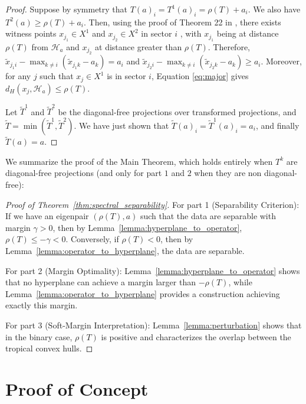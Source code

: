 \documentclass{article}
\renewcommand{\leq}{\leqslant}
\begin{document}
\begin{proof}
Suppose by symmetry that $T(a)_{i}=T^{1}(a)_{i}=\rho(T)+a_{i}$. We
also have $T^{2}(a)\ge\rho(T)+a_{i}$. Then, using the proof of Theorem
22 in \cite{akiangaubertqisaadi}, there exists witness points $x_{j_{1}}\in X^{1}$ and
$x_{j_{2}}\in X^{2}$ in sector $i$ , with $x_{j_{1}}$ being at
distance $\rho(T)$ from $\mathcal{H}_{a}$ and $x_{j_{2}}$ at distance
greater than $\rho(T)$. Therefore, $\tilde{x}_{j_{1}i}-\max_{k\ne i}(\tilde{x}_{j_{1}k}-a_{k})=a_{i}$
and $\tilde{x}_{j_{2}i}-\max_{k\ne i}(\tilde{x}_{j_{2}k}-a_{k})\ge a_{i}$.
Moreover, for any $j$ such that $x_{j}\in X^1$ is in sector $i$,
Equation \ref{eq:major} gives $d_{H}(x_{j},\mathcal{H}_{a})\le\rho(T)$.

Let $\tilde{T}^{1}$ and $\tilde{T}^{2}$ be the diagonal-free projections
over transformed projections, and $\tilde{T}=\min(\tilde{T}^{1},\tilde{T}^{2})$.
We have just shown that $\tilde{T}(a)_{i}=\tilde{T}^{1}(a)_{i}=a_{i}$,
and finally $\tilde{T}(a)=a$. 
\end{proof}

We summarize the proof of the Main Theorem, which holds entirely when $T^k$ are diagonal-free projections (and only for part $1$ and $2$ when they are non diagonal-free):

\begin{proof}[Proof of Theorem~\ref{thm:spectral_separability}]
For part 1 (Separability Criterion): If we have an eigenpair $(\rho(T),a)$ such that the data are separable with margin $\gamma > 0$, then by Lemma~\ref{lemma:hyperplane_to_operator}, $\rho(T) \leq -\gamma < 0$. Conversely, if $\rho(T) < 0$, then by Lemma~\ref{lemma:operator_to_hyperplane}, the data are separable.

For part 2 (Margin Optimality): Lemma~\ref{lemma:hyperplane_to_operator} shows that no hyperplane can achieve a margin larger than $-\rho(T)$, while Lemma~\ref{lemma:operator_to_hyperplane} provides a construction achieving exactly this margin.

For part 3 (Soft-Margin Interpretation): Lemma~\ref{lemma:perturbation} shows that in the binary case, $\rho(T)$ is positive and characterizes the overlap between the tropical convex hulls.
\end{proof}

\section{Proof of Concept}\label{appendix:empirical}
\end{document}
